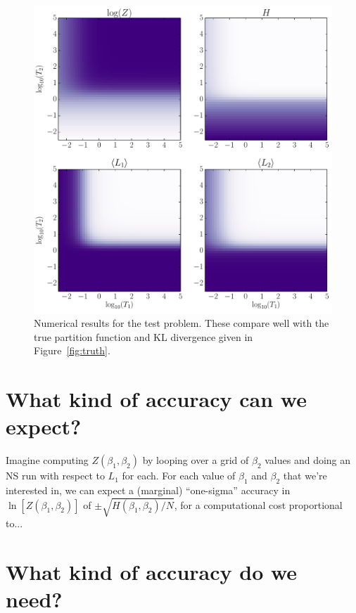 \documentclass[journal,article,accept,moreauthors,pdftex,12pt,a4paper]{mdpi}
\begin{document}
\begin{figure}
\centering
\includegraphics[scale=0.5]{figures/results.pdf}
\caption{Numerical results for the test problem. These compare well with the
true partition function and KL divergence given in Figure~\ref{fig:truth}.
\label{fig:results}}
\end{figure}


\section{What kind of accuracy can we expect?}

Imagine computing $Z(\beta_1, \beta_2)$ by looping over a grid of $\beta_2$
values and doing an NS run with respect to $L_1$ for each. For each
value of $\beta_1$ and $\beta_2$ that we're interested in, we can expect
a (marginal) ``one-sigma'' accuracy in
$\ln\left[Z(\beta_1, \beta_2)\right]$ of $\pm \sqrt{H(\beta_1, \beta_2)/N}$,
for a computational cost proportional to...

\section{What kind of accuracy do we need?}
\end{document}
